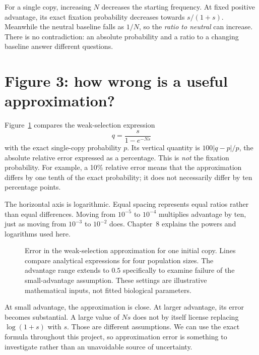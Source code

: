 \begin{table}[htbp]
\centering\small

\caption{Exact fixation probabilities under two starting rules, at \(s=0.01\). The last column is a dimensionless ratio, not a probability.}
\label{tab:initial}
\end{table}

For a single copy, increasing \(N\) decreases the starting frequency. At fixed positive advantage, its exact fixation probability decreases towards \(s/(1+s)\). Meanwhile the neutral baseline falls as \(1/N\), so the \emph{ratio to neutral} can increase. There is no contradiction: an absolute probability and a ratio to a changing baseline answer different questions.

\section{Figure 3: how wrong is a useful approximation?}
Figure~\ref{fig:approximation} compares the weak-selection expression
\[
q=\frac{s}{1-e^{-Ns}}
\]
with the exact single-copy probability \(p\). Its vertical quantity is \(100|q-p|/p\), the absolute relative error expressed as a percentage. This is \emph{not} the fixation probability. For example, a 10\% relative error means that the approximation differs by one tenth of the exact probability; it does not necessarily differ by ten percentage points.

The horizontal axis is logarithmic. Equal spacing represents equal ratios rather than equal differences. Moving from \(10^{-5}\) to \(10^{-4}\) multiplies advantage by ten, just as moving from \(10^{-3}\) to \(10^{-2}\) does. Chapter~8 explains the powers and logarithms used here.

\begin{figure}[htbp]
\centering

\caption{Error in the weak-selection approximation for one initial copy. Lines compare analytical expressions for four population sizes. The advantage range extends to \(0.5\) specifically to examine failure of the small-advantage assumption. These settings are illustrative mathematical inputs, not fitted biological parameters.}
\label{fig:approximation}
\end{figure}

At small advantage, the approximation is close. At larger advantage, its error becomes substantial. A large value of \(Ns\) does not by itself license replacing \(\log(1+s)\) with \(s\). Those are different assumptions. We can use the exact formula throughout this project, so approximation error is something to investigate rather than an unavoidable source of uncertainty.

